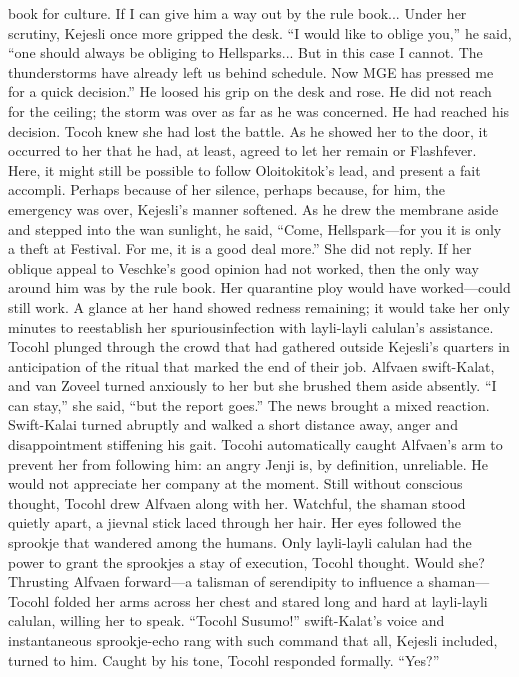 \documentclass[9pt]{article}
\begin{document}
book for culture. If I can give him a way out by the rule book...
Under her scrutiny, Kejesli once more gripped the desk. “I would like to oblige you,” he said, “one
should always be obliging to Hellsparks... But in this case I cannot. The thunderstorms have already left
us behind schedule. Now MGE has pressed me for a quick decision.”
He loosed his grip on the desk and rose. He did not reach for the ceiling; the storm was over as far
as he was concerned. He had reached his decision. Tocoh knew she had lost the battle.
As he showed her to the door, it occurred to her that he had, at least, agreed to let her remain or
Flashfever. Here, it might still be possible to follow Oloitokitok’s lead, and present a fait accompli.
Perhaps because of her silence, perhaps because, for him, the emergency was over, Kejesli’s manner
softened. As he drew the membrane aside and stepped into the wan sunlight, he said, “Come,
Hellspark—for you it is only a theft at Festival. For me, it is a good deal more.”
She did not reply. If her oblique appeal to Veschke’s good opinion had not worked, then the only
way around him was by the rule book. Her quarantine ploy would have worked—could still work. A
glance at her hand showed redness remaining; it would take her only minutes to reestablish her spuriousinfection with layli-layli calulan’s assistance.
Tocohl plunged through the crowd that had gathered outside Kejesli’s quarters in anticipation of the
ritual that marked the end of their job. Alfvaen swift-Kalat, and van Zoveel turned anxiously to her but
she brushed them aside absently. “I can stay,” she said, “but the report goes.”
The news brought a mixed reaction. Swift-Kalai turned abruptly and walked a short distance away,
anger and disappointment stiffening his gait. Tocohi automatically caught Alfvaen’s arm to prevent her
from following him: an angry Jenji is, by definition, unreliable. He would not appreciate her company at
the moment. Still without conscious thought, Tocohl drew Alfvaen along with her.
Watchful, the shaman stood quietly apart, a jievnal stick laced through her hair. Her eyes followed
the sprookje that wandered among the humans. Only layli-layli calulan had the power to grant the
sprookjes a stay of execution, Tocohl thought. Would she?
Thrusting Alfvaen forward—a talisman of serendipity to influence a shaman—Tocohl folded her arms
across her chest and stared long and hard at layli-layli calulan, willing her to speak.
“Tocohl Susumo!” swift-Kalat’s voice and instantaneous sprookje-echo rang with such command
that all, Kejesli included, turned to him.
Caught by his tone, Tocohl responded formally. “Yes?”
\end{document}
